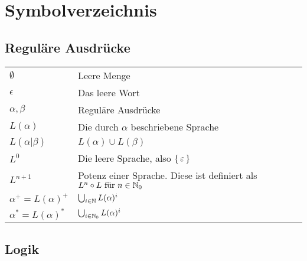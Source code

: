 \chapter*{Symbolverzeichnis}
\section*{Reguläre Ausdrücke}

\settowidth{}
\setlength\mylengthb{\dimexpr\columnwidth-\mylengtha-2\tabcolsep\relax}

\begin{xtabular}{@{} p{\mylengtha} P{\mylengthb} @{}}
 $\emptyset$        & Leere Menge\\
 $\epsilon$         & Das leere Wort\\
 $\alpha, \beta$    & Reguläre Ausdrücke\\
 $L(\alpha)$        & Die durch $\alpha$ beschriebene Sprache\\
 $L(\alpha | \beta)$& $L(\alpha) \cup L(\beta)$\\
 $L^0$              & Die leere Sprache, also $\Set{\varepsilon}$\\
 $L^{n+1}$          & Potenz einer Sprache. Diese ist definiert als\newline $L^n \circ L \text{ für } n \in \mathbb{N}_0$\\
 $\alpha^+ = L(\alpha)^+$ & $\bigcup_{i \in \mathbb{N}} L(\alpha)^i$\\
 $\alpha^* = L(\alpha)^*$ & $\bigcup_{i \in \mathbb{N}_0} L(\alpha)^i$\\
\end{xtabular}

\section*{Logik}


